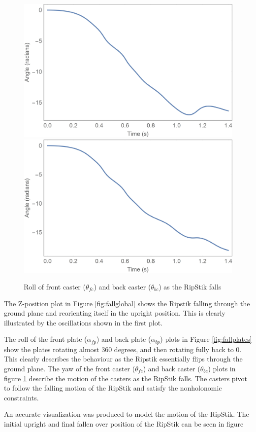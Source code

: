 \begin{figure}[!htb]
	\centering
	\includegraphics[width=\linewidth]{fallthetafc}
	\endminipage\hspace{1em}%
	\includegraphics[width=\linewidth]{fallthetabc}
	\endminipage
	\caption{Roll of front caster ($\theta_{fc}$) and back caster ($\theta_{bc}$) as the RipStik falls}\label{fig:fallcaster}	
\end{figure}

The Z-position plot in Figure \ref{fig:fallglobal} shows the Ripstik falling through the ground plane and reorienting itself in the upright position. 
This is clearly illustrated by the oscillations shown in the first plot.


The roll of the front plate ($\alpha_{fp}$) and back plate ($\alpha_{bp}$) plots in Figure \ref{fig:fallplates} show the plates rotating almost 360 degrees, and then rotating fully back to 0. 
This clearly describes the behaviour as the Ripstik essentially flips through the ground plane.
The yaw of the front caster ($\theta_{fc}$) and back caster ($\theta_{bc}$) plots in figure \ref{fig:fallcaster} describe the motion of the casters as the RipStik falls.
The casters pivot to follow the falling motion of the RipStik and satisfy the nonholonomic constraints.
\par
An accurate visualization was produced to model the motion of the RipStik. The initial upright and final fallen over position of the RipStik can be seen in figure

